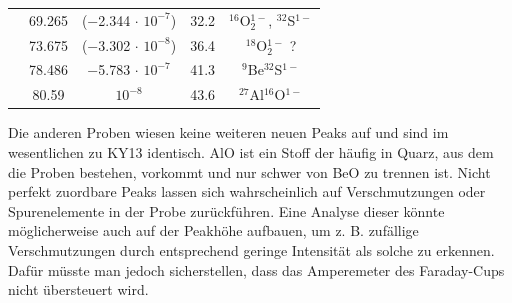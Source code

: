 \begin{table}[H]
\begin{tabular}{|c|c|c|c|c|}
		                     & \num{69.265} & (\num{-2.344} $\cdot$ $10^{-7}$) & \num{32.2} & $^{16}$O$_{2}^{1-}$, $^{32}$S$^{1-}$ \\
		                     & \num{73.675} & (\num{-3.302} $\cdot$ $10^{-8}$) & \num{36.4} & $^{18}$O$_{2}^{1-}$ ?  \\
		                     & \num{78.486} & \num{-5.783} $\cdot$ $10^{-7}$   & \num{41.3} & $^{9}$Be$^{32}$S$^{1-}$ \\
		                     & \num{80.59}  & $10^{-8}$                        & \num{43.6} & $^{27}$Al$^{16}$O$^{1-}$ \\
    \hline
    \end{tabular}
    \label{KY_rest}
\end{table}
Die anderen Proben wiesen keine weiteren neuen Peaks auf und sind im wesentlichen zu KY13 identisch.
AlO ist ein Stoff der häufig in Quarz, aus dem die Proben bestehen, vorkommt und nur schwer von BeO zu trennen ist.
Nicht perfekt zuordbare Peaks lassen sich wahrscheinlich auf Verschmutzungen oder Spurenelemente in der Probe zurückführen.
Eine Analyse dieser könnte möglicherweise auch auf der Peakhöhe aufbauen, um z. B. zufällige Verschmutzungen durch entsprechend geringe Intensität als solche zu erkennen.
Dafür müsste man jedoch sicherstellen, dass das Amperemeter des Faraday-Cups nicht übersteuert wird.

